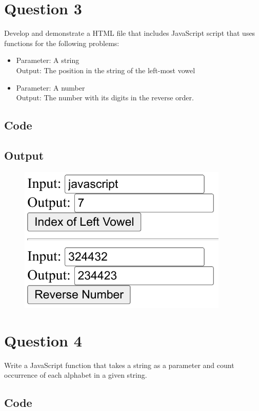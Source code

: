 \documentclass{article}
\begin{document}
\newpage
\section*{Question 3}
Develop and demonstrate a HTML file that includes JavaScript script
that uses functions for the following problems:

\begin{itemize}
  \item Parameter: A string \\
  Output: The position in the string of the left-most vowel
  \item Parameter: A number \\
  Output: The number with its digits in the reverse order.
\end{itemize}
\subsection*{Code}

\newpage
\subsection*{Output}
\begin{figure}[H]
  \centering
  \includegraphics[width=10cm]{3/out.png}
\end{figure}

\newpage
\section*{Question 4}
Write a JavaScript function that takes a string as a parameter and
count occurrence of each alphabet in a given string.
\subsection*{Code}

\newpage
\end{document}
